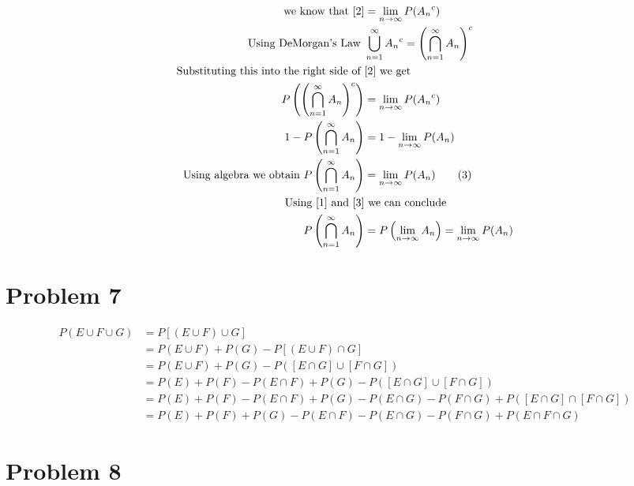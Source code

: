 \documentclass{article}
\begin{document}
\begin{flushleft}
\begin{align*}
\text{we know that } \eqref{2} &= \lim_{n\to \infty}P({A_n}^c)\\
 \text{Using DeMorgan's Law }& \bigcup_{n=1}^{\infty}{A_n}^c=\left(\bigcap_{n=1}^{\infty}A_n\right)^c \\
 \text{Substituting this into the right side of } &\eqref{2} \text{ we get}\\
 P\left(\left(\bigcap_{n=1}^{\infty} A_n\right)^c\right)&=\lim_{n\to \infty}P({A_n}^c)\\
 1-P\left(\bigcap_{n=1}^{\infty} A_n\right)&=1-\lim_{n\to \infty}P(A_n)\\
 \text{Using algebra we obtain } P\left(\bigcap_{n=1}^{\infty} A_n\right)&=\lim_{n\to \infty}P(A_n) \label{3} \tag{3}\\
 \text{Using } \eqref{1} \text{ and } \eqref{3}& \text{ we can conclude}\\
 P\left(\bigcap_{n=1}^{\infty} A_n\right)&=P\left(\lim_{n \to \infty} A_n\right)=\lim_{n\to \infty}P(A_n)\\
\end{align*}
\section*{Problem 7}
\begin{align*}
P(E \cup F \cup G)&=P[(E \cup F)\cup G]\\
&= P(E \cup F)+P(G)-P[(E \cup F) \cap G]\\
&= P(E \cup F)+P(G)-P([E \cap G] \cup [F \cap G])\\
&=P(E)+P(F)-P(E \cap F)+P(G)-P([E \cap G] \cup [F \cap G])\\
&=P(E)+P(F)-P(E \cap F)+P(G)-P(E\cap G)-P(F \cap G)+P([E\cap G] \cap [F \cap G])\\
&=P(E)+P(F)+P(G)-P(E \cap F)-P(E \cap G)-P(F \cap G)+P(E\cap F \cap G)
\end{align*}
\section*{Problem 8}

\end{flushleft}
\end{document}
